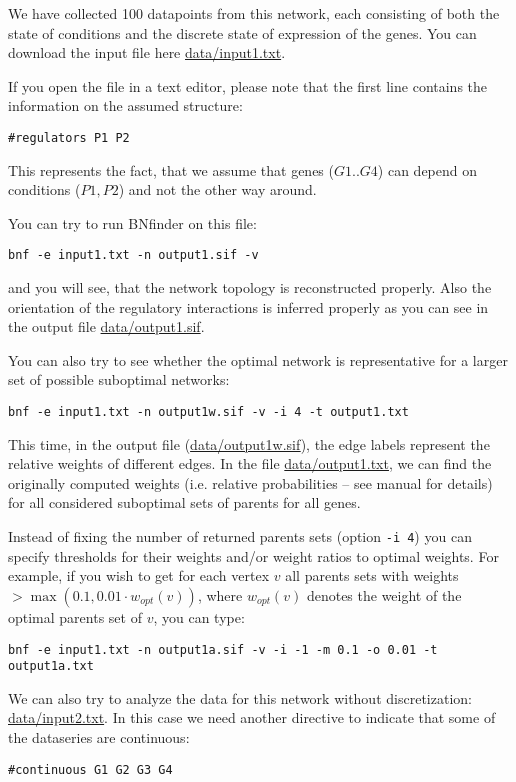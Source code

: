 We have collected 100 datapoints from this network, each consisting of
both the state of conditions and the discrete state of expression of
the genes. You can download the input file here \url{data/input1.txt}.

If you open the file in a text editor, please note that the first line
contains the information on the assumed structure:
\begin{verbatim}
#regulators P1 P2
\end{verbatim}
This represents the fact, that we assume that genes ($G1..G4$) can
depend on conditions ($P1,P2$) and not the other way around.

You can try to run BNfinder on this file:
\begin{verbatim}
bnf -e input1.txt -n output1.sif -v
\end{verbatim}
and you will see, that the network topology is reconstructed
properly. Also the orientation of the regulatory interactions is
inferred properly as you can see in the output file
\url{data/output1.sif}.

You can also try to see whether the optimal network is representative
for a larger set of possible suboptimal networks:
\begin{verbatim}
bnf -e input1.txt -n output1w.sif -v -i 4 -t output1.txt
\end{verbatim}
This time, in the output file (\url{data/output1w.sif}), the edge
labels represent the relative weights of different edges. In the file
\url{data/output1.txt}, we can find the originally computed weights
(i.e. relative probabilities -- see manual for details)
for all considered suboptimal sets of parents for all genes.

Instead of fixing the number of returned parents sets 
(option \texttt{-i 4}) you can specify thresholds for their weights
and/or weight ratios to optimal weights.
For example, if you wish to get for each vertex $v$
all parents sets with weights $>\max(0.1,0.01\cdot w_{opt}(v))$, 
where $w_{opt}(v)$ denotes the weight of the optimal parents set of $v$, 
you can type:
\begin{verbatim}
bnf -e input1.txt -n output1a.sif -v -i -1 -m 0.1 -o 0.01 -t output1a.txt
\end{verbatim}

We can also try to analyze the data for this network without
discretization: \url{data/input2.txt}. In this case we need another
directive to indicate that some of the dataseries are continuous:
\begin{verbatim}
#continuous G1 G2 G3 G4
\end{verbatim}

